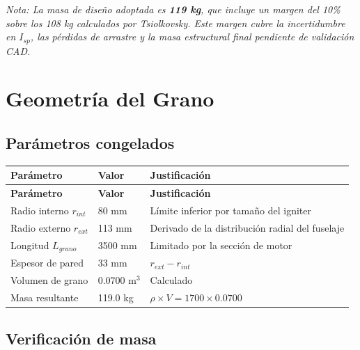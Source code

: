 \documentclass[11pt, a4paper]{article}
\begin{document}
\begin{mdframed}[linecolor=tlvorange, linewidth=0.8pt, backgroundcolor=tlvgray]
  \small\textit{Nota: La masa de dise\~{n}o adoptada es \textbf{119 kg}, que incluye un margen del 10\% sobre los 108 kg calculados por Tsiolkovsky. Este margen cubre la incertidumbre en $I_{sp}$, las p\'{e}rdidas de arrastre y la masa estructural final pendiente de validaci\'{o}n CAD.}
\end{mdframed}

\section{Geometr\'{i}a del Grano}

\subsection{Par\'{a}metros congelados}

\begin{longtable}{L{5cm} C{3cm} L{5.5cm}}
  \color{white}\textbf{Par\'{a}metro} &
  \color{white}\textbf{Valor} &
  \color{white}\textbf{Justificaci\'{o}n} \\
  \endfirsthead
  \color{white}\textbf{Par\'{a}metro} &
  \color{white}\textbf{Valor} &
  \color{white}\textbf{Justificaci\'{o}n} \\
  \endhead
  Radio interno $r_{int}$    & 80 mm   & L\'{i}mite inferior por tama\~{n}o del igniter \\
  Radio externo $r_{ext}$    & 113 mm  & Derivado de la distribuci\'{o}n radial del fuselaje \\
  Longitud $L_{grano}$       & 3500 mm & Limitado por la secci\'{o}n de motor \\
  Espesor de pared           & 33 mm   & $r_{ext} - r_{int}$ \\
  Volumen de grano           & 0.0700 m$^3$ & Calculado \\
  Masa resultante            & 119.0 kg & $\rho \times V = 1700 \times 0.0700$ \\
\end{longtable}

\subsection{Verificaci\'{o}n de masa}
\end{document}
